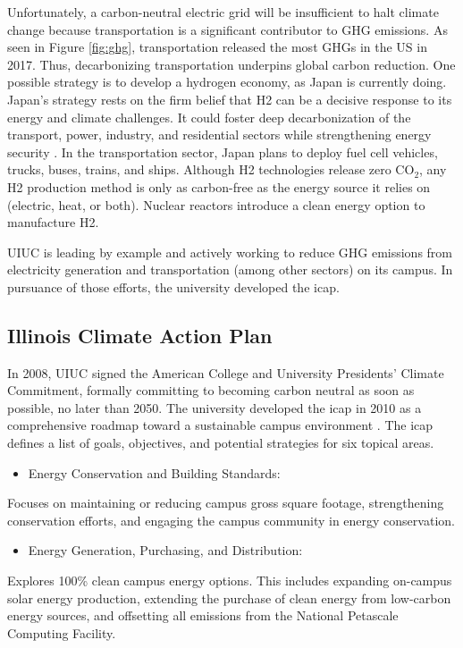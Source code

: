 Unfortunately, a carbon-neutral electric grid will be insufficient to halt climate change because transportation is a significant contributor to \gls{GHG} emissions.
As seen in Figure \ref{fig:ghg}, transportation released the most \glspl{GHG} in the \gls{US} in 2017. Thus, decarbonizing transportation underpins global carbon reduction.
One possible strategy is to develop a hydrogen economy, as Japan is currently doing.
Japan's strategy rests on the firm belief that \gls{H2} can be a decisive response to its energy and climate challenges.
It could foster deep decarbonization of the transport, power, industry, and residential sectors while strengthening energy security \cite{nagashima_japans_2018}.
In the transportation sector, Japan plans to deploy fuel cell vehicles, trucks, buses, trains, and ships.
Although \gls{H2} technologies release zero CO$_2$, any \gls{H2} production method is only as carbon-free as the energy source it relies on (electric, heat, or both).
Nuclear reactors introduce a clean energy option to manufacture \gls{H2}.

\gls{UIUC} is leading by example and actively working to reduce \gls{GHG} emissions from electricity generation and transportation (among other sectors) on its campus.
In pursuance of those efforts, the university developed the \gls{icap}.

\subsection{Illinois Climate Action Plan}

In 2008, \gls{UIUC} signed the American College and University Presidents' Climate Commitment, formally committing to becoming carbon neutral as soon as possible, no later than 2050.
The university developed the \gls{icap} in 2010 as a comprehensive roadmap toward a sustainable campus environment \cite{university_of_illinois_at_urbana-champaign_illlinois_2015}.
The \gls{icap} defines a list of goals, objectives, and potential strategies for six topical areas.

\begin{itemize}
	\item Energy Conservation and Building Standards:
\end{itemize}
Focuses on maintaining or reducing campus gross square footage, strengthening conservation efforts, and engaging the campus community in energy conservation.

\begin{itemize}
	\item Energy Generation, Purchasing, and Distribution:
\end{itemize}
Explores 100\% clean campus energy options.
This includes expanding on-campus solar energy production, extending the purchase of clean energy from low-carbon energy sources, and offsetting all emissions from the National Petascale Computing Facility.

